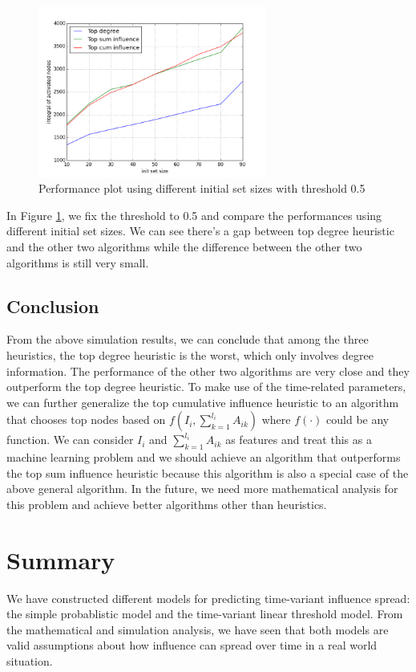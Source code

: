 \documentclass{article}
\begin{document}
\begin{figure}[!htbp]
\centering
\includegraphics[width=7.5cm]{yzplot7.png}
\caption{Performance plot using different initial set sizes with threshold 0.5}
\label{psize}
\end{figure}

In Figure \ref{psize}, we fix the threshold to 0.5 and compare the performances using different initial set sizes. We can see there's a gap between top degree heuristic and the other two algorithms while the difference between the other two algorithms is still very small.

\subsection{Conclusion}

From the above simulation results, we can conclude that among the three heuristics, the top degree heuristic is the worst, which only involves degree information. The performance of the other two algorithms are very close and they outperform the top degree heuristic. To make use of the time-related parameters, we can further generalize the top cumulative influence heuristic to an algorithm that chooses top nodes based on $f(I_i, \sum_{k=1}^{l_i} A_{ik})$ where $f(\cdot)$ could be any function. We can consider $I_i$ and $\sum_{k=1}^{l_i} A_{ik}$ as features and treat this as a machine learning problem and we should achieve an algorithm that outperforms the top sum influence heuristic because this algorithm is also a special case of the above general algorithm. In the future, we need more mathematical analysis for this problem and achieve better algorithms other than heuristics.

\section{Summary}
We have constructed different models for predicting time-variant influence spread: the simple probablistic model and the time-variant linear threshold model. From the mathematical and simulation analysis, we have seen that both models are valid assumptions about how influence can spread over time in a real world situation. 
\end{document}
